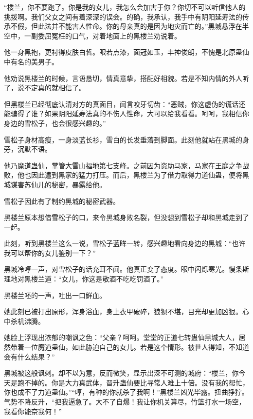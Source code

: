 
\begin{this_body}

“楼兰，你不要跑了。你是我的女儿，我怎么会加害于你？你切不可以听信他人的挑拨啊。我们父女之间有着深深的误会。的确，我承认，我手中有阴阳延寿法的传承不假，但此法并不能害人性命。你的母亲真的是因为地灾而亡的。”黑城悬浮在半空中，一副委屈冤枉的口气，对着地面上的黑楼兰劝说着。

他一身黑袍，更衬得皮肤白皙。眼若点漆，面冠如玉，丰神俊朗，不愧是北原蛊仙中有名的美男子。

他劝说黑楼兰的时候，言语恳切，情真意挚，搭配好相貌。若是不知内情的外人听了，说不定真的就相信了。

但黑楼兰已经彻底认清对方的真面目，闻言咬牙切齿：“恶贼，你这虚伪的谎话还能骗得了谁？如果阴阳延寿法真的不伤人性命，大可以给我看看。呵呵，我相信你身边的雪松子，也会很感兴趣的。”

雪松子身材高瘦，一身淡蓝长衫，雪白的长发垂落到脚面。此刻他就站在黑城的身旁，沉默不语。

他乃魔道蛊仙，掌管大雪山福地第七支峰。之前因为资助马家，马家在王庭之争战败，他也因此遭到黑家的猛力打压。而后，黑楼兰为了借力取得力道仙蛊，便将黑城谋害苏仙儿的秘密，暴露给他。

雪松子因此有了制约黑城的秘密武器。

黑楼兰原本想借雪松子的口，来令黑城身败名裂，但没想到雪松子却和黑城走到了一起。

此刻，听到黑楼兰这么一说，雪松子蓝眸一转，感兴趣地看向身边的黑城：“也许我可以帮你的女儿鉴别一下？”

黑城冷哼一声，对雪松子的话充耳不闻。他真正变了态度。眼中闪烁寒光。慢条斯理地对黑楼兰道：“女儿，你这是敬酒不吃吃罚酒了。”

黑楼兰呸的一声，吐出一口鲜血。

她此刻已被打出原形，浑身浴血，身上衣甲破碎，狼狈不堪，目光却更加凶狠。心中杀机沸腾。

她脸上浮现出浓郁的嘲讽之色：“父亲？呵呵。堂堂的正道七转蛊仙黑城大人，居然带着一位魔道蛊仙，如此胁迫自己的女儿。若是这个情形。被世人得知，不知道会有什么结果？”

黑城被这般讽刺。却不以为意，反而微笑，显示出深不可测的城府：“楼兰，你今天是跑不掉的。你是大力真武体，晋升蛊仙要比寻常人难上十倍。没有我的帮忙，你也成不了力道蛊仙。”“哼，有种的你就杀了我啊！”黑楼兰凶光毕露。扭曲狰狞。气势不降反升，“把我逼急了。大不了自爆！我让你机关算尽，竹篮打水一场空，我看你能奈我何！”


\end{this_body}
